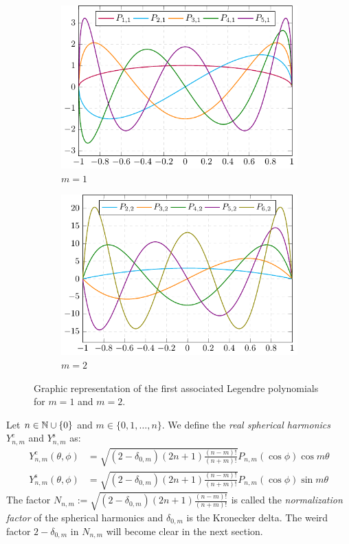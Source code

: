 \documentclass[../main.tex]{subfiles}
\begin{document}
\begin{figure}[ht]
  \centering
  \begin{subfigure}[b]{0.48\textwidth}
    \includegraphics[width=\textwidth]{Images/assolegendre1.pdf}
    \caption{$m=1$}
  \end{subfigure}
  \quad
  \begin{subfigure}[b]{0.48\textwidth}
    \includegraphics[width=\textwidth]{Images/assolegendre2.pdf}
    \caption{$m=2$}
  \end{subfigure}
  \caption{Graphic representation of the first associated Legendre polynomials for $m=1$ and $m=2$.}
\end{figure}
\begin{definition}
  Let $n\in\mathbb{N}\cup\{0\}$ and $m\in\{0,1,\dots,n\}$. We define the \emph{real spherical harmonics} $Y_{n,m}^{\mathrm{c}}$ and $Y_{n,m}^{\mathrm{s}}$ as:
  \begin{align}
    Y_{n,m}^{\mathrm{c}}(\theta,\phi) & =\sqrt{(2-\delta_{0,m})(2n+1)\frac{(n-m)!}{(n+m)!} }P_{n,m}(\cos\phi) \cos{m\theta} \\
    Y_{n,m}^{\mathrm{s}}(\theta,\phi) & =\sqrt{(2-\delta_{0,m})(2n+1)\frac{(n-m)!}{(n+m)!} }P_{n,m}(\cos\phi) \sin{m\theta}
  \end{align}
  The factor $N_{n,m}:=\sqrt{(2-\delta_{0,m})(2n+1)\frac{(n-m)!}{(n+m)!} }$ is called the \emph{normalization factor} of the spherical harmonics and $\delta_{0,m}$ is the Kronecker delta. The weird factor $2-\delta_{0,m}$ in $N_{n,m}$ will become clear in the next section.
\end{definition}
\end{document}
